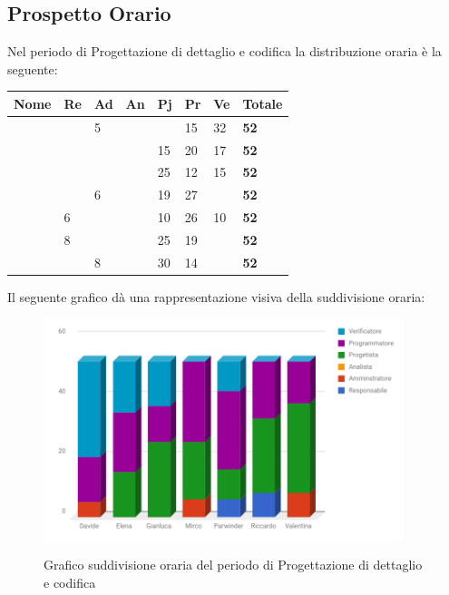 \documentclass[PianoDiProgetto.tex]{subfiles}
\begin{document}
\subsection{Prospetto Orario}
Nel periodo di Progettazione di dettaglio e codifica la distribuzione oraria è la seguente:
\begin{center}
	\begin{table}[htbp]
		\centering
		\renewcommand\arraystretch{1.5}
		\begin{tabularx}{\textwidth}{p{4cm}|p{1cm}|p{1cm}|p{1cm}|p{1cm}|p{1cm}|p{1cm}|p{2cm}}
			\hline
			\textbf{Nome} & \textbf{Re} & \textbf{Ad} & \textbf{An} & \textbf{Pj} & \textbf{Pr} & \textbf{Ve} & \textbf{Totale} \\
			\hline
			\Davide & \ & 5 & \ & \ & 15 & 32 & \textbf{52} \\
			\hline
			\Elena & \ & \ & \ & 15 & 20 & 17 & \textbf{52} \\
			\hline
			\Gianluca & \ & \ & \ & 25 & 12 & 15 & \textbf{52} \\
			\hline
			\Mirco & \ & 6 & \ & 19 & 27 & \ & \textbf{52} \\
			\hline
			\Parwinder & 6 & \ & \ & 10 & 26 & 10 & \textbf{52} \\
			\hline
			\Riccardo & 8 & \ & \ & 25 & 19 & \ & \textbf{52} \\
			\hline
			\Valentina & \ & 8 & \ & 30 & 14 & \ & \textbf{52} \\
			\hline
		\end{tabularx}
	\end{table} 	
\end{center}
Il seguente grafico dà una rappresentazione visiva della suddivisione oraria:
\begin{figure}[h]
	\centering
	\includegraphics[width=10.5cm]{images/prospettoOrario/progCod.png}
	\label{fig:foo}
	\caption{Grafico suddivisione oraria del periodo di Progettazione di dettaglio e codifica}
\end{figure} 
\newpage
\end{document}
